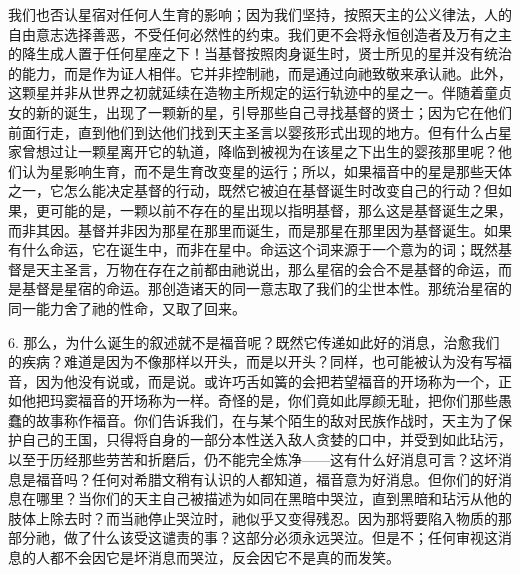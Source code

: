 我们也否认星宿对任何人生育的影响；因为我们坚持，按照天主的公义律法，人的自由意志选择善恶，不受任何必然性的约束。我们更不会将永恒创造者及万有之主的降生成人置于任何星座之下！当基督按照肉身诞生时，贤士所见的星并没有统治的能力，而是作为证人相伴。它并非控制祂，而是通过向祂致敬来承认祂。此外，这颗星并非从世界之初就延续在造物主所规定的运行轨迹中的星之一。伴随着童贞女的新的诞生，出现了一颗新的星，引导那些自己寻找基督的贤士；因为它在他们前面行走，直到他们到达他们找到天主圣言以婴孩形式出现的地方。但有什么占星家曾想过让一颗星离开它的轨道，降临到被视为在该星之下出生的婴孩那里呢？他们认为星影响生育，而不是生育改变星的运行；所以，如果福音中的星是那些天体之一，它怎么能决定基督的行动，既然它被迫在基督诞生时改变自己的行动？但如果，更可能的是，一颗以前不存在的星出现以指明基督，那么这是基督诞生之果，而非其因。基督并非因为那星在那里而诞生，而是那星在那里因为基督诞生。如果有什么命运，它在诞生中，而非在星中。命运这个词来源于一个意为的词；既然基督是天主圣言，万物在存在之前都由祂说出，那么星宿的会合不是基督的命运，而是基督是星宿的命运。那创造诸天的同一意志取了我们的尘世本性。那统治星宿的同一能力舍了祂的性命，又取了回来。\par

6. 那么，为什么诞生的叙述就不是福音呢？既然它传递如此好的消息，治愈我们的疾病？难道是因为不像那样以开头，而是以开头？同样，也可能被认为没有写福音，因为他没有说或，而是说。或许巧舌如簧的会把若望福音的开场称为一个，正如他把玛窦福音的开场称为一样。奇怪的是，你们竟如此厚颜无耻，把你们那些愚蠢的故事称作福音。你们告诉我们，在与某个陌生的敌对民族作战时，天主为了保护自己的王国，只得将自身的一部分本性送入敌人贪婪的口中，并受到如此玷污，以至于历经那些劳苦和折磨后，仍不能完全炼净——这有什么好消息可言？这坏消息是福音吗？任何对希腊文稍有认识的人都知道，福音意为好消息。但你们的好消息在哪里？当你们的天主自己被描述为如同在黑暗中哭泣，直到黑暗和玷污从他的肢体上除去时？而当祂停止哭泣时，祂似乎又变得残忍。因为那将要陷入物质的那部分祂，做了什么该受这谴责的事？这部分必须永远哭泣。但是不；任何审视这消息的人都不会因它是坏消息而哭泣，反会因它不是真的而发笑。\par


